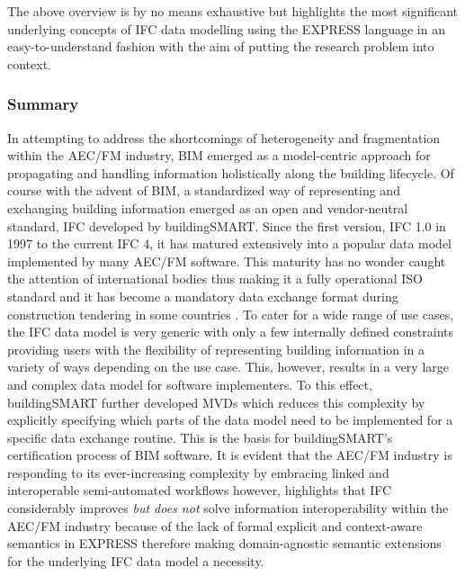 The above overview is by no means exhaustive but highlights the most significant underlying concepts of \ac{IFC} data modelling using the EXPRESS language in an easy-to-understand fashion with the aim of putting the research problem into context. 

\subsubsection{Summary}
In attempting to address the shortcomings of heterogeneity and fragmentation within the \ac{AEC/FM} industry, \ac{BIM} emerged as a model-centric approach for propagating and handling information holistically along the building lifecycle. Of course with the advent of \ac{BIM}, a standardized way of representing and exchanging building information emerged as an open and vendor-neutral standard, \ac{IFC} developed by buildingSMART. Since the first version, \ac{IFC} 1.0 in 1997 to the current IFC 4, it has matured extensively into a popular data model implemented by many \ac{AEC/FM} software. This maturity has no wonder caught the attention of international bodies thus making it a fully operational ISO standard \citep{ISO16739:202424} and it has become a mandatory data exchange format during construction tendering in some countries \citep{AEC-UK2012}. To cater for a wide range of use cases, the \ac{IFC} data model is very generic with only a few internally defined constraints providing users with the flexibility of representing building information in a variety of ways depending on the use case. This, however, results in a very large and complex data model for software implementers. To this effect, buildingSMART further developed \acp{MVD} which reduces this complexity by explicitly specifying which parts of the data model need to be implemented for a specific data exchange routine. This is the basis for buildingSMART's certification process of \ac{BIM} software. It is evident that the \ac{AEC/FM} industry is responding to its ever-increasing complexity by embracing linked and interoperable semi-automated workflows however, \cite{Pauwels2016, Pauwels2017, Pauwels} highlights that \ac{IFC} considerably improves \emph{but does not} solve information interoperability within the \ac{AEC/FM} industry because of the lack of formal explicit and context-aware semantics in EXPRESS \citep{Barbau2012} therefore making domain-agnostic semantic extensions for the underlying \ac{IFC} data model a necessity.  

